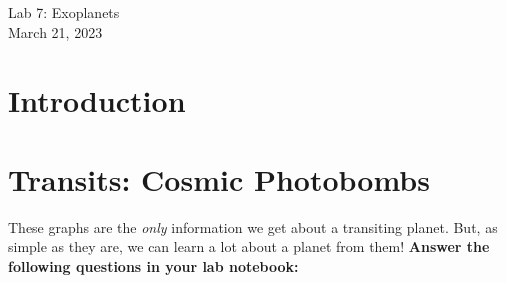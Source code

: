 \documentclass[11pt]{article}
\begin{document}
\begin{center}
\huge{Lab 7: Exoplanets}\\ \medskip \Large{March 21, 2023}
\end{center}

\section{Introduction}

\section{Transits: Cosmic Photobombs}

\medskip \noindent
These graphs are the \textit{only} information we get about a transiting planet. But, as simple as they are, we can learn a lot about a planet from them!  \textbf{Answer the following questions in your lab notebook:}
\end{document}
